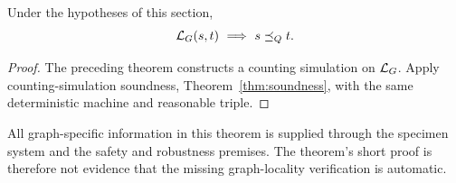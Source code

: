 \begin{theorem}
Under the hypotheses of this section,
\[
 \mathcal L_G(s,t)\ \Longrightarrow\ s\preceq_Q t.
\]
\end{theorem}
\begin{proof}
The preceding theorem constructs a counting simulation on $\mathcal L_G$.
Apply counting-simulation soundness, Theorem~\ref{thm:soundness}, with
the same deterministic machine and reasonable triple.
\end{proof}
All graph-specific information in this theorem is supplied through the
specimen system and the safety and robustness premises. The theorem's
short proof is therefore not evidence that the missing graph-locality
verification is automatic.

